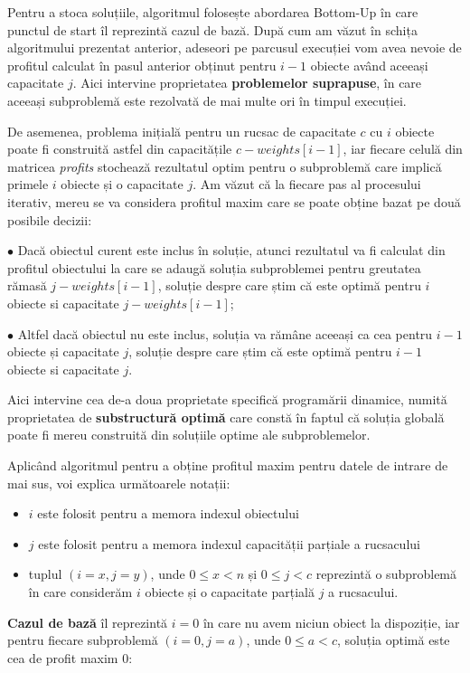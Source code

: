 \begin{sloppypar}
Pentru a stoca soluțiile, algoritmul folosește abordarea Bottom-Up în care punctul de start îl reprezintă cazul de bază. După cum am văzut în schița algoritmului prezentat anterior, adeseori pe parcusul execuției vom avea nevoie de profitul calculat în pasul anterior obținut pentru \(i - 1\) obiecte având aceeași capacitate \(j\). Aici intervine proprietatea \textbf{problemelor suprapuse}, în care aceeași subproblemă este rezolvată de mai multe ori în timpul execuției. \par
De asemenea, problema inițială pentru un rucsac de capacitate \(c\) cu \(i\) obiecte poate fi construită astfel din capacitățile \(c - weights[i - 1]\), 
iar fiecare celulă din matricea \textit{profits} stochează rezultatul optim pentru o subproblemă care implică primele \(i\) obiecte și o capacitate \(j\). Am văzut că la fiecare pas al procesului iterativ, mereu se va considera profitul maxim care se poate obține bazat pe două posibile decizii: \par
$\bullet$ Dacă obiectul curent este inclus în soluție, atunci rezultatul va fi calculat din profitul obiectului la care se adaugă soluția subproblemei pentru greutatea rămasă \(j - weights[i - 1]\), soluție despre care știm că este optimă pentru \(i\) obiecte si capacitate \(j - weights[i - 1]\); \par
$\bullet$ Altfel dacă obiectul nu este inclus, soluția va rămâne aceeași ca cea pentru \(i - 1\) obiecte și capacitate \(j\), soluție despre care știm că este optimă pentru \(i - 1\) obiecte si capacitate \(j\). \par
Aici intervine cea de-a doua proprietate specifică programării dinamice, numită proprietatea de \textbf{substructură optimă} care constă în faptul că soluția globală poate fi mereu construită din soluțiile optime ale subproblemelor.
\\ \par
Aplicând algoritmul pentru a obține profitul maxim pentru datele de intrare de mai sus, voi explica următoarele notații:
\begin{itemize}
    \item $i$ este folosit pentru a memora indexul obiectului
    \item $j$ este folosit pentru a memora indexul capacității parțiale a rucsacului
    \item tuplul $(i = x, j = y)$, unde $0 \le x < n$ și $0 \le j < c$ reprezintă o subproblemă în care considerăm $i$ obiecte și o capacitate parțială $j$ a rucsacului.
\end{itemize}
\par
\textbf{Cazul de bază} îl reprezintă $i = 0$ în care nu avem niciun obiect la dispoziție, iar pentru fiecare subproblemă $(i = 0, j = a)$, unde $0 \le a < c$, soluția optimă este cea de profit maxim 0:


\end{sloppypar}
